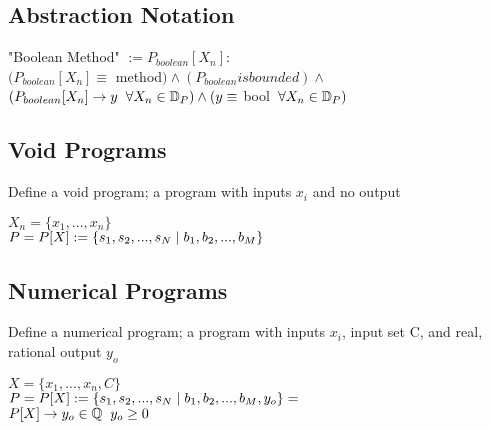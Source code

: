 \documentclass[11pt]{article}
\begin{document}
\subsection{Abstraction Notation}
\begin{center}
"Boolean Method" $:= P_{boolean}[X_n]:
$
\\ \vspace{2mm}
$
(P_{boolean}[X_n] \equiv $ method$) \land (P_{boolean} is bounded) \land
$
\\ \vspace{2mm}
$
(P_{boolean}[X_n] \rightarrow y \hspace{2mm} \forall X_n \in \mathbb{D}_{P}) \land (y \equiv $ bool$ \hspace{2mm} \forall  X_n \in \mathbb{D}_{P})
$
\end{center}



\subsection{Void Programs}
Define a void program; a program with inputs $x_i$ and no output
\begin{center}
$
X_n = \{x_1,...,x_n\}
$
\\ \vspace{2mm}
$P = P\lbrack X \rbrack := \{ s_1,s_2,...,s_{N}\hspace{1mm}|\hspace{1mm} b_1, b_2,...,b_M\}$
\end{center}





\subsection{Numerical Programs}
Define a numerical program; a program with inputs $x_i$, input set C, and real, rational output $y_o$
\begin{center}
$
X = \{x_1,...,x_n,C\}
$
\\ \vspace{2mm}
$P = P\lbrack X \rbrack := \{ s_1,s_2,...,s_{N}\hspace{1mm}|\hspace{1mm} b_1, b_2,...,b_M,y_o\}=$
\\ \vspace{2mm}
$
P\lbrack X \rbrack \rightarrow y_o \in \mathbb{Q} \hspace{2mm} y_o \geq 0
$
\end{center}
\end{document}
